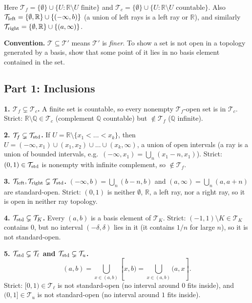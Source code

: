 \documentclass[11pt]{article}
\newcommand{\R}{\mathbb{R}}
\newcommand{\Q}{\mathbb{Q}}
\newcommand{\T}{\mathcal{T}}
\begin{document}
Here $\T_f=\{\emptyset\}\cup\{U:\R\setminus U\text{ finite}\}$ and $\T_c=\{\emptyset\}\cup\{U:\R\setminus U\text{ countable}\}$. Also $\T_{\rm left}=\{\emptyset,\R\}\cup\{(-\infty,b)\}$ (a union of left rays is a left ray or $\R$), and similarly $\T_{\rm right}=\{\emptyset,\R\}\cup\{(a,\infty)\}$.

\textbf{Convention.} $\T\subseteq\T'$ means $\T'$ is \emph{finer}. To show a set is not open in a topology generated by a basis, show that some point of it lies in no basis element contained in the set.

\subsection*{Part 1: Inclusions}

\textbf{1. $\T_f\subsetneq\T_c$.} A finite set is countable, so every nonempty $\T_f$-open set is in $\T_c$. Strict: $\R\setminus\Q\in\T_c$ (complement $\Q$ countable) but $\notin\T_f$ ($\Q$ infinite).

\textbf{2. $\T_f\subsetneq\T_{\rm std}$.} If $U=\R\setminus\{x_1<\dots<x_k\}$, then $U=(-\infty,x_1)\cup(x_1,x_2)\cup\dots\cup(x_k,\infty)$, a union of open intervals (a ray is a union of bounded intervals, e.g.\ $(-\infty,x_1)=\bigcup_n(x_1-n,x_1)$). Strict: $(0,1)\in\T_{\rm std}$ is nonempty with infinite complement, so $\notin\T_f$.

\textbf{3. $\T_{\rm left},\T_{\rm right}\subsetneq\T_{\rm std}$.} $(-\infty,b)=\bigcup_n(b-n,b)$ and $(a,\infty)=\bigcup_n(a,a+n)$ are standard-open. Strict: $(0,1)$ is neither $\emptyset$, $\R$, a left ray, nor a right ray, so it is open in neither ray topology.

\textbf{4. $\T_{\rm std}\subsetneq\T_K$.} Every $(a,b)$ is a basis element of $\T_K$. Strict: $(-1,1)\setminus K\in\T_K$ contains $0$, but no interval $(-\delta,\delta)$ lies in it (it contains $1/n$ for large $n$), so it is not standard-open.

\textbf{5. $\T_{\rm std}\subsetneq\T_\ell$ and $\T_{\rm std}\subsetneq\T_u$.}
\[
(a,b)=\bigcup_{x\in(a,b)}[x,b)=\bigcup_{x\in(a,b)}(a,x].
\]
Strict: $[0,1)\in\T_\ell$ is not standard-open (no interval around $0$ fits inside), and $(0,1]\in\T_u$ is not standard-open (no interval around $1$ fits inside).
\end{document}
